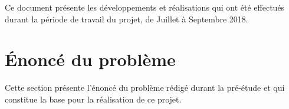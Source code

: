Ce document présente les développements et réalisations qui ont été effectués durant la période de travail du projet, de Juillet à Septembre 2018.

\section{Énoncé du problème}

Cette section présente l'énoncé du problème rédigé durant la pré-étude et qui constitue la base pour la réalisation de ce projet.

